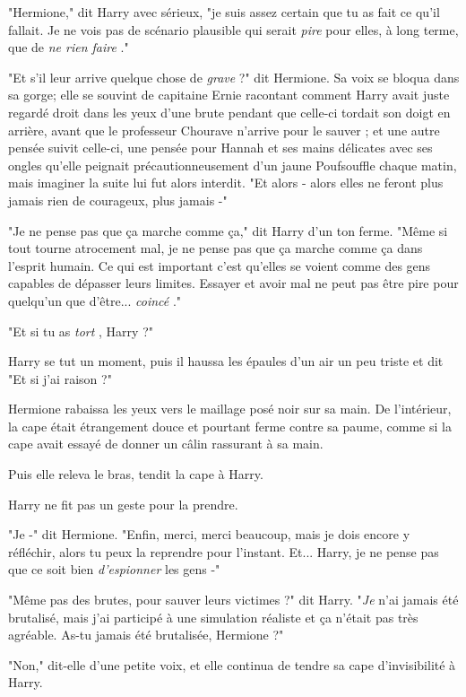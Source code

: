 "Hermione," dit Harry avec sérieux, "je suis assez certain que tu as fait ce qu'il fallait. Je ne vois pas de scénario plausible qui serait \emph{pire}  pour elles, à long terme, que de \emph{ne rien faire} ."

"Et s'il leur arrive quelque chose de \emph{grave}  ?" dit Hermione. Sa voix se bloqua dans sa gorge; elle se souvint de capitaine Ernie racontant comment Harry avait juste regardé droit dans les yeux d'une brute pendant que celle-ci tordait son doigt en arrière, avant que le professeur Chourave n'arrive pour le sauver ; et une autre pensée suivit celle-ci, une pensée pour Hannah et ses mains délicates avec ses ongles qu'elle peignait précautionneusement d'un jaune Poufsouffle chaque matin, mais imaginer la suite lui fut alors interdit. "Et alors - alors elles ne feront plus jamais rien de courageux, plus jamais -"

"Je ne pense pas que ça marche comme ça," dit Harry d'un ton ferme. "Même si tout tourne atrocement mal, je ne pense pas que ça marche comme ça dans l'esprit humain. Ce qui est important c'est qu'elles se voient comme des gens capables de dépasser leurs limites. Essayer et avoir mal ne peut pas être pire pour quelqu'un que d'être... \emph{coincé} ."

"Et si tu as \emph{tort} , Harry ?"

Harry se tut un moment, puis il haussa les épaules d'un air un peu triste et dit "Et si j'ai raison ?"

Hermione rabaissa les yeux vers le maillage posé noir sur sa main. De l'intérieur, la cape était étrangement douce et pourtant ferme contre sa paume, comme si la cape avait essayé de donner un câlin rassurant à sa main.

Puis elle releva le bras, tendit la cape à Harry.

Harry ne fit pas un geste pour la prendre.

"Je -" dit Hermione. "Enfin, merci, merci beaucoup, mais je dois encore y réfléchir, alors tu peux la reprendre pour l'instant. Et... Harry, je ne pense pas que ce soit bien \emph{d'espionner}  les gens -"

"Même pas des brutes, pour sauver leurs victimes ?" dit Harry. "\emph{Je}  n'ai jamais été brutalisé, mais j'ai participé à une simulation réaliste et ça n'était pas très agréable. As-tu jamais été brutalisée, Hermione ?"

"Non," dit-elle d'une petite voix, et elle continua de tendre sa cape d'invisibilité à Harry.

